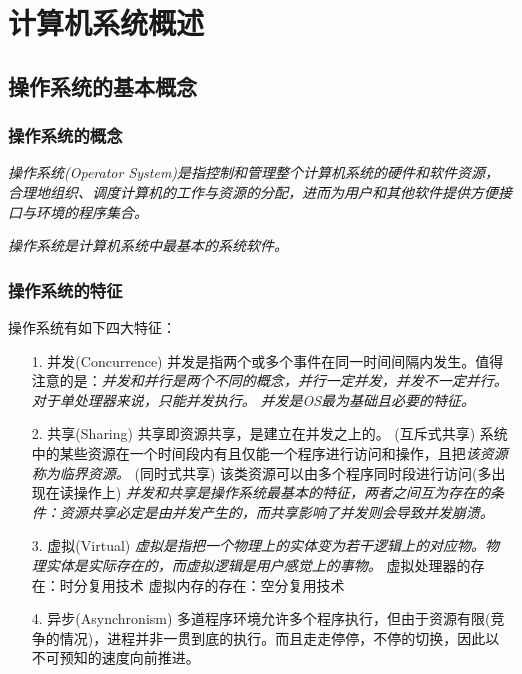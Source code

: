 \chapter{计算机系统概述}

\section{操作系统的基本概念}

\subsection{操作系统的概念}

    \emph{操作系统(Operator System)是指控制和管理整个计算机系统的{\color{red}硬件和软件资源}，合理地组织、调度计算机的工作与资源的分配，进而为用户和其他软件提供方便接口与环境的程序集合。}

    \emph{\color{red}操作系统是计算机系统中最基本的系统软件。}

\subsection{操作系统的特征}

    操作系统有如下四大特征：

\begin{itemize}
    \item [1.] 并发(Concurrence)
    \subitem 并发是指两个或多个事件在同一时间间隔内发生。值得注意的是：\emph{并发和并行是两个不同的概念，{\color{red}并行一定并发，并发不一定并行。对于单处理器来说，只能并发执行。}}
    \subitem \emph{并发是OS最为基础且必要的特征。}
    \item [2.] 共享(Sharing)
    \subitem 共享即资源共享，是建立在并发之上的。
    \subitem (互斥式共享) 系统中的某些资源在一个时间段内有且仅能一个程序进行访问和操作，且把\emph{{\color{red}该资源称为临界资源。}}
    \subitem (同时式共享) 该类资源可以由多个程序同时段进行访问(多出现在读操作上)
    \subitem \emph{并发和共享是操作系统{\color{red}最基本}的特征，两者之间互为存在的条件：资源共享必定是由并发产生的，而共享影响了并发则会导致并发崩溃。}
    \item [3.] 虚拟(Virtual)
    \subitem \emph{虚拟是指把一个物理上的实体变为若干逻辑上的对应物。{\color{red}物理实体是实际存在的，而虚拟逻辑是用户感觉上的事物。}}
    \subitem 虚拟处理器的存在：时分复用技术
    \subitem 虚拟内存的存在：空分复用技术
    \item [4.] 异步(Asynchronism)
    \subitem 多道程序环境允许多个程序执行，但由于资源有限(竞争的情况)，进程并非一贯到底的执行。而且走走停停，不停的切换，因此以不可预知的速度向前推进。
\end{itemize}

